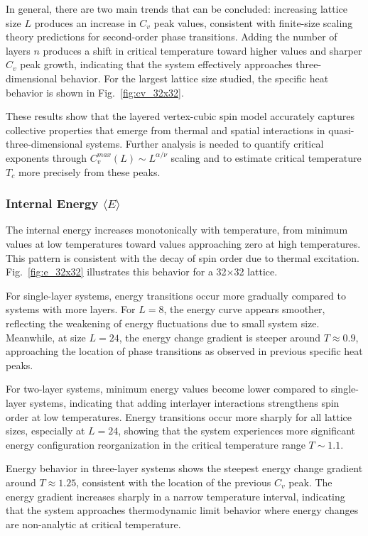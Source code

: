 In general, there are two main trends that can be concluded: increasing lattice size $L$ produces an increase in $C_v$ peak values, consistent with finite-size scaling theory predictions for second-order phase transitions. Adding the number of layers $n$ produces a shift in critical temperature toward higher values and sharper $C_v$ peak growth, indicating that the system effectively approaches three-dimensional behavior. For the largest lattice size studied, the specific heat behavior is shown in Fig.~\ref{fig:cv_32x32}.

These results show that the layered vertex-cubic spin model accurately captures collective properties that emerge from thermal and spatial interactions in quasi-three-dimensional systems. Further analysis is needed to quantify critical exponents through $C_v^{max}(L) \sim L^{\alpha/\nu}$ scaling and to estimate critical temperature $T_c$ more precisely from these peaks.

\subsubsection{Internal Energy $\langle E \rangle$}

The internal energy increases monotonically with temperature, from minimum values at low temperatures toward values approaching zero at high temperatures. This pattern is consistent with the decay of spin order due to thermal excitation. Fig.~\ref{fig:e_32x32} illustrates this behavior for a 32×32 lattice.

For single-layer systems, energy transitions occur more gradually compared to systems with more layers. For $L = 8$, the energy curve appears smoother, reflecting the weakening of energy fluctuations due to small system size. Meanwhile, at size $L = 24$, the energy change gradient is steeper around $T \approx 0.9$, approaching the location of phase transitions as observed in previous specific heat peaks.

For two-layer systems, minimum energy values become lower compared to single-layer systems, indicating that adding interlayer interactions strengthens spin order at low temperatures. Energy transitions occur more sharply for all lattice sizes, especially at $L = 24$, showing that the system experiences more significant energy configuration reorganization in the critical temperature range $T \sim 1.1$.

Energy behavior in three-layer systems shows the steepest energy change gradient around $T \approx 1.25$, consistent with the location of the previous $C_v$ peak. The energy gradient increases sharply in a narrow temperature interval, indicating that the system approaches thermodynamic limit behavior where energy changes are non-analytic at critical temperature.

